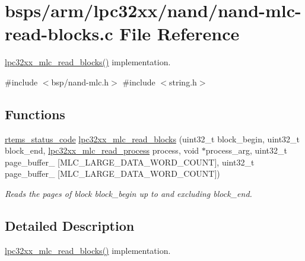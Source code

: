 \hypertarget{nand-mlc-read-blocks_8c}{}\section{bsps/arm/lpc32xx/nand/nand-\/mlc-\/read-\/blocks.c File Reference}
\label{nand-mlc-read-blocks_8c}


\mbox{\hyperlink{group__lpc32xx__nand__mlc_ga2d5f41c8abd5910ad853e7ba096c9f7b}{lpc32xx\+\_\+mlc\+\_\+read\+\_\+blocks()}} implementation.  


{\ttfamily \#include $<$bsp/nand-\/mlc.\+h$>$}\newline
{\ttfamily \#include $<$string.\+h$>$}\newline
\subsection*{Functions}
\begin{DoxyCompactItemize}
\item 
\mbox{\hyperlink{group__ClassicStatus_ga545d41846817eaba6143d52ee4d9e9fe}{rtems\+\_\+status\+\_\+code}} \mbox{\hyperlink{group__lpc32xx__nand__mlc_ga2d5f41c8abd5910ad853e7ba096c9f7b}{lpc32xx\+\_\+mlc\+\_\+read\+\_\+blocks}} (uint32\+\_\+t block\+\_\+begin, uint32\+\_\+t block\+\_\+end, \mbox{\hyperlink{group__lpc32xx__nand__mlc_ga8adf1c46b26e07838b729a78d83332ee}{lpc32xx\+\_\+mlc\+\_\+read\+\_\+process}} process, void $\ast$process\+\_\+arg, uint32\+\_\+t page\+\_\+buffer\+\_ \mbox{[}M\+L\+C\+\_\+\+L\+A\+R\+G\+E\+\_\+\+D\+A\+T\+A\+\_\+\+W\+O\+R\+D\+\_\+\+C\+O\+U\+NT\mbox{]}, uint32\+\_\+t page\+\_\+buffer\+\_ \mbox{[}M\+L\+C\+\_\+\+L\+A\+R\+G\+E\+\_\+\+D\+A\+T\+A\+\_\+\+W\+O\+R\+D\+\_\+\+C\+O\+U\+NT\mbox{]})
\begin{DoxyCompactList}\small\item\em Reads the pages of block {\itshape block\+\_\+begin} up to and excluding {\itshape block\+\_\+end}. \end{DoxyCompactList}\end{DoxyCompactItemize}


\subsection{Detailed Description}
\mbox{\hyperlink{group__lpc32xx__nand__mlc_ga2d5f41c8abd5910ad853e7ba096c9f7b}{lpc32xx\+\_\+mlc\+\_\+read\+\_\+blocks()}} implementation. 

